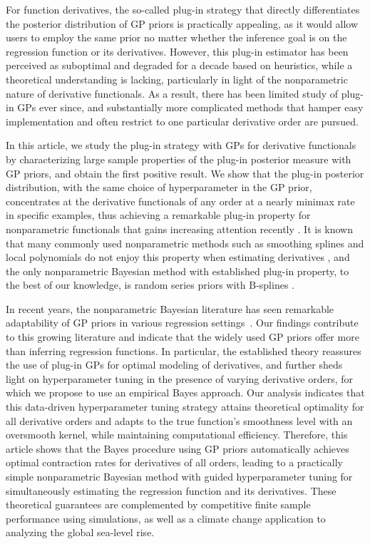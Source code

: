\documentclass[12pt]{article}
\theoremstyle{plain}
\theoremstyle{nonitalicremark}
\begin{document}
For function derivatives, the so-called plug-in strategy that directly differentiates the posterior distribution of GP priors is practically appealing, as it would allow users to employ the same prior no matter whether the inference goal is on the regression function or its derivatives. However, this plug-in estimator has been perceived as suboptimal and degraded for a decade \citep{stein2012interpolation,holsclaw2013gaussian} based on heuristics, while a theoretical understanding is lacking, particularly in light of the nonparametric nature of derivative functionals. As a result, there has been limited study of plug-in GPs ever since, and substantially more complicated methods that hamper easy implementation and often restrict to one particular derivative order are pursued. 

In this article, we study the plug-in strategy with GPs for derivative functionals by characterizing large sample properties of the plug-in posterior measure with GP priors, and obtain the first positive result. We show that the plug-in posterior distribution, with the same choice of hyperparameter in the GP prior, concentrates at the derivative functionals of any order at a nearly minimax rate in specific examples, thus achieving a remarkable plug-in property for nonparametric functionals that gains increasing attention recently \citep{yoo2016supremum,liu2020non}. It is known that many commonly used nonparametric methods such as smoothing splines and local polynomials do not enjoy this property when estimating derivatives \citep{wahba1990optimal,charnigo2011generalized}, and the only nonparametric Bayesian method with established plug-in property, to the best of our knowledge, is random series priors with B-splines \citep{yoo2016supremum}. 

In recent years, the nonparametric Bayesian literature has seen remarkable adaptability of GP priors in various regression settings~\citep{van2009adaptive, bhattacharya2014anisotropic, jiang2021variable}. Our findings contribute to this growing literature and indicate that the widely used GP priors offer more than inferring regression functions. In particular, the established theory reassures the use of plug-in GPs for optimal modeling of derivatives, and further sheds light on hyperparameter tuning in the presence of varying derivative orders, for which we propose to use an empirical Bayes approach. Our analysis indicates that this data-driven hyperparameter tuning strategy attains theoretical optimality for all derivative orders and adapts to the true function's smoothness level with an oversmooth kernel, while maintaining computational efficiency. Therefore, this article shows that the Bayes procedure using GP priors automatically achieves optimal contraction rates for derivatives of all orders, leading to a practically simple nonparametric Bayesian method with guided hyperparameter tuning for simultaneously estimating the regression function and its derivatives. These theoretical guarantees are complemented by competitive finite sample performance using simulations, as well as a climate change application to analyzing the global sea-level rise. 
\end{document}
